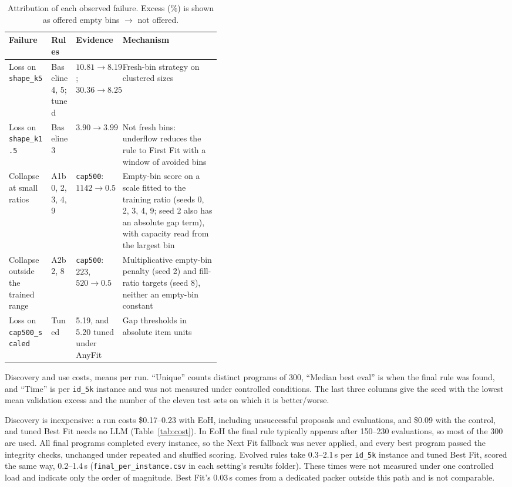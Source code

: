 \documentclass[10pt,twocolumn]{article}
\makeatletter
\renewcommand\subsection{\@startsection{subsection}{2}{\z@}{2.2ex \@plus .5ex \@minus .2ex}{1ex \@plus .2ex}{\normalfont\large\bfseries}}
\makeatother
\begin{document}
\begin{table}[t]
\centering\footnotesize
\caption{Attribution of each observed failure. Excess (\%) is shown as offered empty bins $\rightarrow$ not offered.}
\label{tab:attribution}
\begin{tabularx}{\linewidth}{@{}p{0.2\linewidth}lp{0.22\linewidth}X@{}}
\toprule
Failure & Rules & Evidence & Mechanism\\
\midrule
Loss on \texttt{shape\_k5} & Baseline 4, 5; tuned & $10.81\rightarrow 8.19$; $30.36\rightarrow 8.25$ & Fresh-bin strategy on clustered sizes\\
Loss on \texttt{shape\_k1.5} & Baseline 3 & $3.90\rightarrow 3.99$ & Not fresh bins: underflow reduces the rule to First Fit with a window of avoided bins\\
Collapse at small ratios & A1b 0, 2, 3, 4, 9 & \texttt{cap500}: $1142\rightarrow 0.5$ & Empty-bin score on a scale fitted to the training ratio (seeds 0, 2, 3, 4, 9; seed 2 also has an absolute gap term), with capacity read from the largest bin\\
Collapse outside the trained range & A2b 2, 8 & \texttt{cap500}: $223$, $520\rightarrow 0.5$ & Multiplicative empty-bin penalty (seed 2) and fill-ratio targets (seed 8), neither an empty-bin constant\\
Loss on \texttt{cap500\_scaled} & Tuned & 5.19, and 5.20 tuned under AnyFit & Gap thresholds in absolute item units\\
\bottomrule
\end{tabularx}
\end{table}

\subsection{Cost of discovery and cost of use}
\label{sec:res-cost}
\begin{table}[t]
\centering\footnotesize
\caption{Discovery and use costs, means per run. ``Unique'' counts distinct programs of 300, ``Median best eval'' is when the final rule was found, and ``Time'' is per \texttt{id\_5k} instance and was not measured under controlled conditions. The last three columns give the seed with the lowest mean validation excess and the number of the eleven test sets on which it is better/worse.}
\label{tab:cost}

\end{table}

Discovery is inexpensive: a run costs \$0.17--0.23 with EoH, including unsuccessful proposals and evaluations, and \$0.09 with the control, and tuned Best Fit needs no LLM (Table~\ref{tab:cost}). In EoH the final rule typically appears after 150--230 evaluations, so most of the 300 are used. All final programs completed every instance, so the Next Fit fallback was never applied, and every best program passed the integrity checks, unchanged under repeated and shuffled scoring. Evolved rules take 0.3--2.1\,s per \texttt{id\_5k} instance and tuned Best Fit, scored the same way, 0.2--1.4\,s (\texttt{final\_per\_instance.csv} in each setting's results folder). These times were not measured under one controlled load and indicate only the order of magnitude. Best Fit's 0.03\,s comes from a dedicated packer outside this path and is not comparable.
\end{document}
